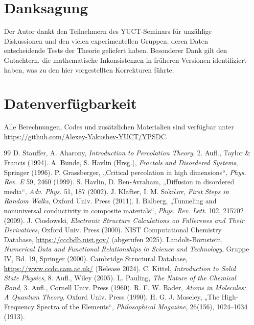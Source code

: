 \documentclass[12pt,a4paper]{article}
\begin{document}
	\section*{Danksagung}
	
	Der Autor dankt den Teilnehmern des YUCT-Seminars für unzählige Diskussionen und den vielen experimentellen Gruppen, deren Daten entscheidende Tests der Theorie geliefert haben. Besonderer Dank gilt den Gutachtern, die mathematische Inkonsistenzen in früheren Versionen identifiziert haben, was zu den hier vorgestellten Korrekturen führte.
	
	\section*{Datenverfügbarkeit}
	
	Alle Berechnungen, Codes und zusätzlichen Materialien sind verfügbar unter \url{https://github.com/Alexey-Yakushev-YUCT/YPSDC}.
	
	\begin{thebibliography}{99}
		 D. Stauffer, A. Aharony, \emph{Introduction to Percolation Theory}, 2. Aufl., Taylor \& Francis (1994).
		 A. Bunde, S. Havlin (Hrsg.), \emph{Fractals and Disordered Systems}, Springer (1996).
		 P. Grassberger, „Critical percolation in high dimensions“, \emph{Phys. Rev. E} 59, 2460 (1999).
		 S. Havlin, D. Ben-Avraham, „Diffusion in disordered media“, \emph{Adv. Phys.} 51, 187 (2002).
		 J. Klafter, I. M. Sokolov, \emph{First Steps in Random Walks}, Oxford Univ. Press (2011).
		 I. Balberg, „Tunneling and nonuniversal conductivity in composite materials“, \emph{Phys. Rev. Lett.} 102, 215702 (2009).
		 J. Cioslowski, \emph{Electronic Structure Calculations on Fullerenes and Their Derivatives}, Oxford Univ. Press (2000).
		 NIST Computational Chemistry Database, \url{https://cccbdb.nist.gov/} (abgerufen 2025).
		 Landolt-Börnstein, \emph{Numerical Data and Functional Relationships in Science and Technology}, Gruppe IV, Bd. 19, Springer (2000).
		 Cambridge Structural Database, \url{https://www.ccdc.cam.ac.uk/} (Release 2024).
		 C. Kittel, \emph{Introduction to Solid State Physics}, 8. Aufl., Wiley (2005).
		 L. Pauling, \emph{The Nature of the Chemical Bond}, 3. Aufl., Cornell Univ. Press (1960).
		 R. F. W. Bader, \emph{Atoms in Molecules: A Quantum Theory}, Oxford Univ. Press (1990).
		 H. G. J. Moseley, „The High-Frequency Spectra of the Elements“, \emph{Philosophical Magazine}, 26(156), 1024–1034 (1913).
	\end{thebibliography}
	
\end{document}
